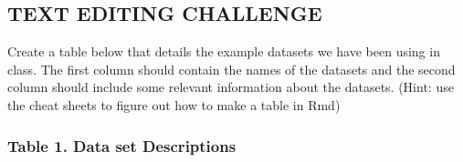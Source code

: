 \documentclass[
]{article}
\begin{document}
\hypertarget{text-editing-challenge}{%
\subsection{TEXT EDITING CHALLENGE}\label{text-editing-challenge}}

Create a table below that details the example datasets we have been
using in class. The first column should contain the names of the
datasets and the second column should include some relevant information
about the datasets. (Hint: use the cheat sheets to figure out how to
make a table in Rmd)

\hypertarget{table-1.-data-set-descriptions}{%
\subsubsection{Table 1. Data set
Descriptions}\label{table-1.-data-set-descriptions}}
\end{document}
